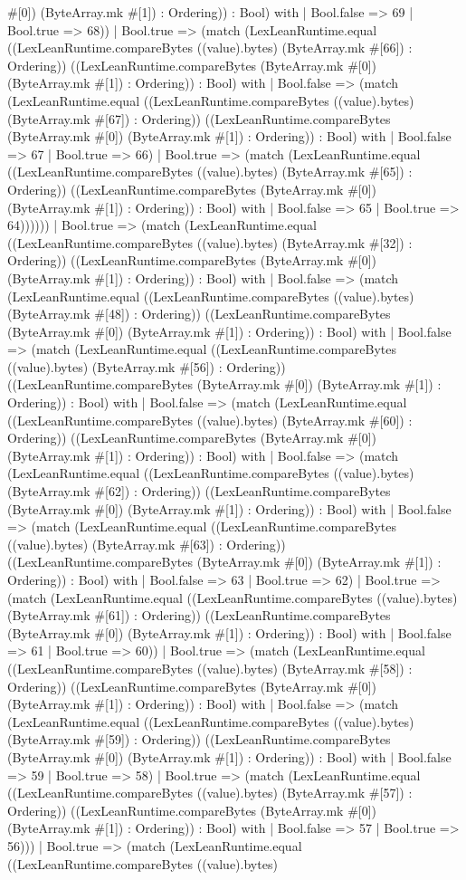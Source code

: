\documentclass[11pt]{article}
\begin{document}
\#[0]) (ByteArray.mk \#[1]) : Ordering)) : Bool) with | Bool.false => 69 | Bool.true => 68)) | Bool.true => (match (LexLeanRuntime.equal ((LexLeanRuntime.compareBytes ((value).bytes) (ByteArray.mk \#[66]) : Ordering)) ((LexLeanRuntime.compareBytes (ByteArray.mk \#[0]) (ByteArray.mk \#[1]) : Ordering)) : Bool) with | Bool.false => (match (LexLeanRuntime.equal ((LexLeanRuntime.compareBytes ((value).bytes) (ByteArray.mk \#[67]) : Ordering)) ((LexLeanRuntime.compareBytes (ByteArray.mk \#[0]) (ByteArray.mk \#[1]) : Ordering)) : Bool) with | Bool.false => 67 | Bool.true => 66) | Bool.true => (match (LexLeanRuntime.equal ((LexLeanRuntime.compareBytes ((value).bytes) (ByteArray.mk \#[65]) : Ordering)) ((LexLeanRuntime.compareBytes (ByteArray.mk \#[0]) (ByteArray.mk \#[1]) : Ordering)) : Bool) with | Bool.false => 65 | Bool.true => 64)))))) | Bool.true => (match (LexLeanRuntime.equal ((LexLeanRuntime.compareBytes ((value).bytes) (ByteArray.mk \#[32]) : Ordering)) ((LexLeanRuntime.compareBytes (ByteArray.mk \#[0]) (ByteArray.mk \#[1]) : Ordering)) : Bool) with | Bool.false => (match (LexLeanRuntime.equal ((LexLeanRuntime.compareBytes ((value).bytes) (ByteArray.mk \#[48]) : Ordering)) ((LexLeanRuntime.compareBytes (ByteArray.mk \#[0]) (ByteArray.mk \#[1]) : Ordering)) : Bool) with | Bool.false => (match (LexLeanRuntime.equal ((LexLeanRuntime.compareBytes ((value).bytes) (ByteArray.mk \#[56]) : Ordering)) ((LexLeanRuntime.compareBytes (ByteArray.mk \#[0]) (ByteArray.mk \#[1]) : Ordering)) : Bool) with | Bool.false => (match (LexLeanRuntime.equal ((LexLeanRuntime.compareBytes ((value).bytes) (ByteArray.mk \#[60]) : Ordering)) ((LexLeanRuntime.compareBytes (ByteArray.mk \#[0]) (ByteArray.mk \#[1]) : Ordering)) : Bool) with | Bool.false => (match (LexLeanRuntime.equal ((LexLeanRuntime.compareBytes ((value).bytes) (ByteArray.mk \#[62]) : Ordering)) ((LexLeanRuntime.compareBytes (ByteArray.mk \#[0]) (ByteArray.mk \#[1]) : Ordering)) : Bool) with | Bool.false => (match (LexLeanRuntime.equal ((LexLeanRuntime.compareBytes ((value).bytes) (ByteArray.mk \#[63]) : Ordering)) ((LexLeanRuntime.compareBytes (ByteArray.mk \#[0]) (ByteArray.mk \#[1]) : Ordering)) : Bool) with | Bool.false => 63 | Bool.true => 62) | Bool.true => (match (LexLeanRuntime.equal ((LexLeanRuntime.compareBytes ((value).bytes) (ByteArray.mk \#[61]) : Ordering)) ((LexLeanRuntime.compareBytes (ByteArray.mk \#[0]) (ByteArray.mk \#[1]) : Ordering)) : Bool) with | Bool.false => 61 | Bool.true => 60)) | Bool.true => (match (LexLeanRuntime.equal ((LexLeanRuntime.compareBytes ((value).bytes) (ByteArray.mk \#[58]) : Ordering)) ((LexLeanRuntime.compareBytes (ByteArray.mk \#[0]) (ByteArray.mk \#[1]) : Ordering)) : Bool) with | Bool.false => (match (LexLeanRuntime.equal ((LexLeanRuntime.compareBytes ((value).bytes) (ByteArray.mk \#[59]) : Ordering)) ((LexLeanRuntime.compareBytes (ByteArray.mk \#[0]) (ByteArray.mk \#[1]) : Ordering)) : Bool) with | Bool.false => 59 | Bool.true => 58) | Bool.true => (match (LexLeanRuntime.equal ((LexLeanRuntime.compareBytes ((value).bytes) (ByteArray.mk \#[57]) : Ordering)) ((LexLeanRuntime.compareBytes (ByteArray.mk \#[0]) (ByteArray.mk \#[1]) : Ordering)) : Bool) with | Bool.false => 57 | Bool.true => 56))) | Bool.true => (match (LexLeanRuntime.equal ((LexLeanRuntime.compareBytes ((value).bytes) 
\end{document}

